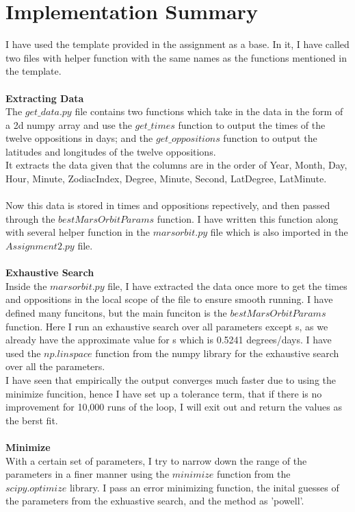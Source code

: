 \documentclass[12pt]{article}
\begin{document}
\section*{Implementation Summary}
I have used the template provided in the assignment as a base. In it, I have called two files with helper function with the same names as the functions mentioned in the template.\\ \\
\textbf{Extracting Data}\\
The $get\_data.py$ file contains two functions which take in the data in the form of a 2d numpy array and use the $get\_times$ function to output the times of the twelve oppositions in days; and the $get\_oppositions$ function to output the latitudes and longitudes of the twelve oppositions. \\ It extracts the data given that the columns are in the order of Year, Month, Day, Hour, Minute, ZodiacIndex, Degree, Minute, Second, LatDegree, LatMinute.\\ \\
Now this data is stored in times and oppositions repectively, and then passed through the $bestMarsOrbitParams$ function. I have written this function along with several helper function in the $marsorbit.py$ file which is also imported in the $Assignment2.py$ file.\\ \\
\textbf{Exhaustive Search}\\
Inside the $marsorbit.py$ file, I have extracted the data once more to get the times and oppositions in the local scope of the file to ensure smooth running. I have defined many funcitons, but the main funciton is the $bestMarsOrbitParams$ function. Here I run an exhaustive search over all parameters except s, as we already have the approximate value for s which is 0.5241 degrees/days. I have used the $np.linspace$ function from the numpy library for the exhaustive search over all the parameters.\\
I have seen that empirically the output converges much faster due to using the minimize funcition, hence I have set up a tolerance term, that if there is no improvement for 10,000 runs of the loop, I will exit out and return the values as the berst fit.\\ \\
\textbf{Minimize}\\
With a certain set of parameters, I try to narrow down the range of the parameters in a finer manner using the $minimize$ function from the $scipy.optimize$ library. I pass an error minimizing function, the inital guesses of the parameters from the exhuastive search, and the method as 'powell'.\\ \\
\end{document}
